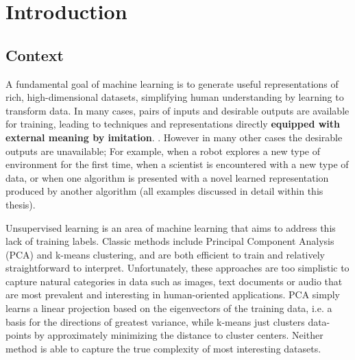 \chapter{Introduction} \label{ch:intro}


\section{Context}
A fundamental goal of machine learning is to generate useful representations of rich, high-dimensional datasets, simplifying human understanding by learning to transform data.
In many cases, pairs of inputs and desirable outputs are available for training, leading to techniques and representations directly {\bf equipped with external meaning by imitation}. . However in many other cases the desirable outputs are unavailable; For example, when a robot explores a new type of environment for the first time, when a scientist is encountered with a new type of data, or when one algorithm is presented with a novel learned representation produced by another algorithm (all examples discussed in detail within this thesis).

Unsupervised learning is an area of machine learning that aims to address this lack of training labels.  Classic methods include Principal Component Analysis (PCA) and k-means clustering, and are both efficient to train and relatively straightforward to interpret. Unfortunately, these approaches are too simplistic to capture natural categories in data such as images, text documents or audio that are most prevalent and interesting in human-oriented applications. PCA simply learns a linear projection based on the eigenvectors of the training data, i.e. a basis for the directions of greatest variance, while k-means just clusters data-points by approximately minimizing the distance to cluster centers. Neither method is able to capture the true complexity of most interesting datasets.

